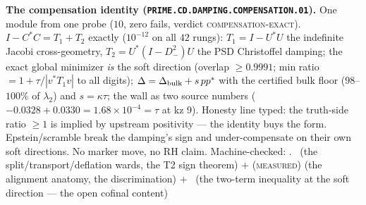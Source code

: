 \documentclass[11pt,a4paper]{article}
\theoremstyle{definition}
\begin{document}
\par\smallskip\noindent\textbf{The compensation identity
(\texttt{PRIME.CD.\allowbreak DAMPING.COMPENSATION.01}).}
One module from one probe ($10$, zero fails, verdict
\textsc{compensation-exact}).  $I - C^*C = T_1 + T_2$ exactly
($10^{-12}$ on all $42$ rungs): $T_1 = I - U^*U$ the indefinite
Jacobi cross-geometry, $T_2 = U^*(I - D_-^2)U$ the PSD
Christoffel damping; the exact global minimizer \emph{is} the
soft direction (overlap $\ge 0.9991$; min ratio $= 1 +
\tau/|v^*T_1v|$ to all digits); $\Delta = \Delta_{\rm bulk} +
s\,pp^*$ with the certified bulk floor ($98$--$100\%$ of
$\lambda_2$) and $s = \kappa\tau$; the wall as two source
numbers ($-0.0328 + 0.0330 = 1.68\times10^{-4} = \tau$ at kz 9).
Honesty line typed: the truth-side ratio $\ge 1$ is implied by
upstream positivity --- the identity buys the form.
Epstein/scramble break the damping's sign and under-compensate
on their own soft directions.  No marker move, no RH claim.
Machine-checked: .
\mE\ (the split/transport/deflation wards, the T2 sign theorem)
$+$ (\textsc{measured}) (the alignment anatomy, the
discrimination) $+$ \mO\ (the two-term inequality at the soft
direction --- the open cofinal content)
\par\smallskip
\end{document}
